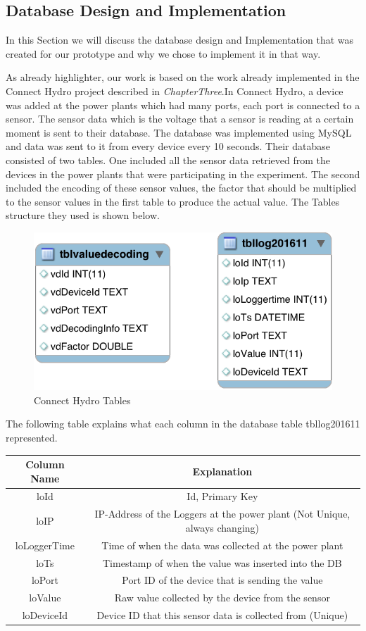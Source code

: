 \subsection{Database Design and Implementation}
\label{subsec:DatabaseDesignandImplementation}
In this Section we will discuss the database design and Implementation that was created for our prototype and why we chose to implement it in that way.

As already highlighter, our work is based on the work already implemented in the Connect Hydro project described in \textit{ChapterThree}.In Connect Hydro, a device was added at the power plants which had many ports, each port is connected to a sensor. The sensor data which is the voltage that a sensor is reading at a certain moment is sent to their database. The database was implemented using MySQL and data was sent to it from every device every 10 seconds. Their database consisted of two tables. One included all the sensor data retrieved from the devices in the power plants that were participating in the experiment. The second included the encoding of these sensor values, the factor that should be multiplied to the sensor values in the first table to produce the actual value. The Tables structure they used is shown below.
\begin{figure}[H]
\centering
\includegraphics[scale=0.4]{Images/LoggingDatabase.png}
\caption[Connect Hydro Tables]{Connect Hydro Tables}
\end{figure}
The following table explains what each column in the database table tbllog201611 represented.
\begin{center}
\begin{tabular}{ |c|c| } 
 \hline
 Column Name & Explanation\\ [0.5ex] 
 \hline\hline
loId & Id, Primary Key\\ 
\hline
loIP & IP-Address of the Loggers at the power plant (Not Unique, always changing)\\ 
\hline
loLoggerTime & Time of when the data was collected at the power plant\\ 
\hline
loTs & Timestamp of when the value was inserted into the DB\\ 
\hline
loPort & Port ID of the device that is sending the value\\ 
\hline
loValue & Raw value collected by the device from the sensor\\
\hline
loDeviceId & Device ID that this sensor data is collected from (Unique)\\
 \hline
\end{tabular}
\end{center}
